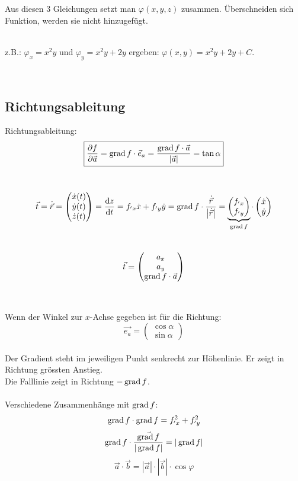 Aus diesen 3 Gleichungen setzt man $\varphi(x,y,z)$ zusammen. Überschneiden sich Funktion, werden sie nicht hinzugefügt.\\
\\
\begin{footnotesize}
z.B.: $\varphi_{x}=x^2y$ und $\varphi_{y}=x^2y +2y$ ergeben: $\varphi(x,y)=x^2y +2y+C$.
\end{footnotesize}
\\


\subsection{Richtungsableitung}
Richtungsableitung:
\[\boxed{
	\frac{\partial f}{\partial \vec{a}} = \operatorname{grad} f \cdot \vec{e}_a = \frac{\operatorname{grad} f \cdot \vec{a}}{\left| \vec{a} \right|} = \tan\alpha
}\]

\\
\[
	\vec{t}=\dot{\vec{r}}=
	\begin{pmatrix}
	 	\dot{x}(t)\\
		\dot{y}(t)\\
		\dot{z}(t)
	\end{pmatrix}
	=
	\frac{\mathrm{d} z}{\mathrm{d} t}=f_{'x}\dot x +f_{'y} \dot y
	=
	\operatorname{grad} f\cdot \frac{\dot{\vec{r}}}{\left| \dot{\vec{r}}\right| }
	=
	\underbrace{
		\begin{pmatrix}
				 	f_{'x}\\
					f_{'y}
			\end{pmatrix}
	}_{\operatorname{grad} f}
	\cdot
	\begin{pmatrix}
			 	\dot x\\
				\dot y
		\end{pmatrix}	
\]
\\
\[
	\vec{t}=	
	\begin{pmatrix}
		a_x\\
		a_y\\
		\operatorname{grad} f\cdot \vec{a}
	\end{pmatrix}
\]
\\
\\
Wenn der Winkel zur $x$-Achse gegeben ist für die Richtung:
\[
	\vec{e_a}=	
	\begin{pmatrix}
		\cos\alpha\\
		\sin\alpha
	\end{pmatrix}
\]
\\
Der Gradient steht im jeweiligen Punkt senkrecht zur Höhenlinie. Er zeigt in Richtung grössten Anstieg.\\
Die Falllinie zeigt in Richtung $-\operatorname{grad} f$.
\\
\\
Verschiedene Zusammenhänge mit $\operatorname{grad} f$:
\[
	\operatorname{grad} f \cdot \operatorname{grad} f = f_{'x}^2+f_{'y}^2
\]
\[
	\operatorname{grad} f\cdot \frac{	\vec{\operatorname{grad} f}}{|\operatorname{grad} f|}=|\operatorname{grad} f|
\]
\[
	\vec{a} \cdot	\vec{b} = 	\left| \vec{a} \right| \cdot	\left| \vec{b} \right| \cdot \cos \varphi
\]